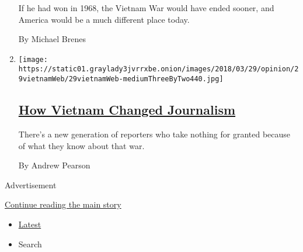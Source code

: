 \begin{enumerate}
  If he had won in 1968, the Vietnam War would have ended sooner, and
  America would be a much different place today.

  By Michael Brenes
\item
  \texttt{[image: https://static01.graylady3jvrrxbe.onion/images/2018/03/29/opinion/29vietnamWeb/29vietnamWeb-mediumThreeByTwo440.jpg]}

  \hypertarget{how-vietnam-changed-journalism}{%
  \subsection{\texorpdfstring{\href{/2018/03/29/opinion/vietnam-war-journalism.html}{How
  Vietnam Changed
  Journalism}}{How Vietnam Changed Journalism}}\label{how-vietnam-changed-journalism}}

  There's a new generation of reporters who take nothing for granted
  because of what they know about that war.

  By Andrew Pearson
\end{enumerate}

Advertisement

\protect\hyperlink{after-mid1}{Continue reading the main story}

\begin{itemize}
\tightlist
\item
  \protect\hyperlink{stream-panel}{Latest}
\item
  Search
\end{itemize}

